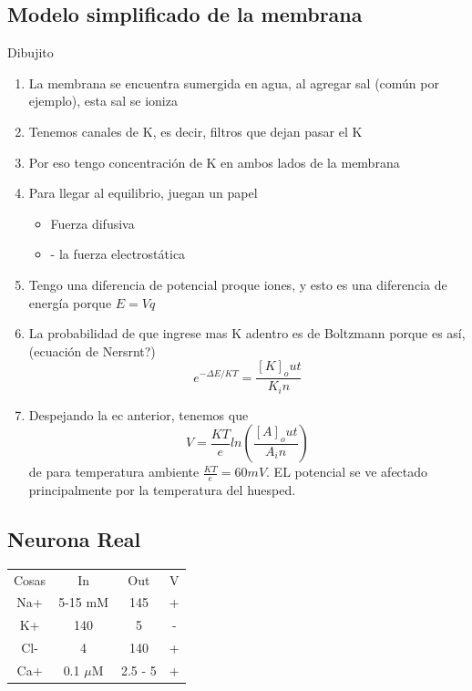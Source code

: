 \subsection{Modelo simplificado de la membrana}
Dibujito
\begin{enumerate}
	\item La membrana se encuentra sumergida en agua, al agregar sal (común por ejemplo), esta sal se ioniza
	\item Tenemos canales de K, es decir, filtros que dejan pasar el K
	\item Por eso tengo concentración de K en ambos lados de la membrana
	\item Para llegar al equilibrio, juegan un papel 
	\begin{itemize}
		\item Fuerza difusiva 
		\item- la fuerza electrostática
	\end{itemize}
	\item Tengo una diferencia de potencial proque iones, y esto es una diferencia de energía porque $E = Vq$
	\item La probabilidad de que ingrese mas K adentro es de Boltzmann porque es así, (ecuación de Nersrnt?)
	\begin{equation}
		e^{-\Delta E / KT} = \frac{[K]_out}{K_in}
	\end{equation}
	\item Despejando la ec anterior, tenemos que
	\begin{equation}
		V = \frac{KT}{e} ln(\frac{[A]_out}{A_in})
	\end{equation}
	de para temperatura ambiente $\frac{KT}{e} = 60 mV$. EL potencial se ve afectado principalmente por la temperatura del huesped.
\end{enumerate}

\subsection{Neurona Real}
\begin{table}
\centering
\begin{tabular}{c|c|c|c}
Cosas & In & Out & V \\
Na+ & 5-15 mM & 145 & + \\
K+  & 140  &  5  & - \\
Cl- & 4 	& 140 & +\\
Ca+ & 0.1 $\mu$M& 2.5 - 5 & +\\ 
\end{tabular}
\end{table}

